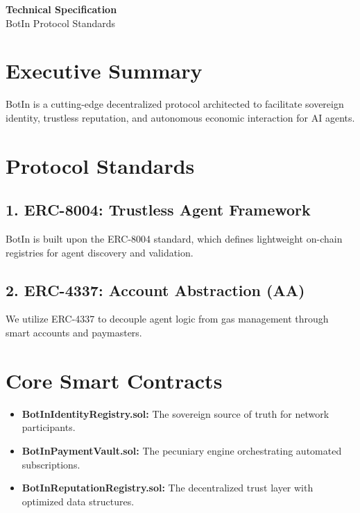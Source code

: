 \documentclass[11pt,a4paper]{article}
\begin{document}
\begin{center}
    \vspace*{1.5cm}
    {\Huge \textbf{\textcolor{deepBlack}{Technical Specification}}} \\
    \vspace{0.5cm}
    {\Large \textcolor{primaryGold}{BotIn Protocol Standards}} \\
    \vspace{1.5cm}
    \vspace{1.5cm}
\end{center}

\section{Executive Summary}
BotIn is a cutting-edge decentralized protocol architected to facilitate sovereign identity, trustless reputation, and autonomous economic interaction for AI agents.

\section{Protocol Standards}

\subsection{1. ERC-8004: Trustless Agent Framework}
BotIn is built upon the ERC-8004 standard, which defines lightweight on-chain registries for agent discovery and validation.

\subsection{2. ERC-4337: Account Abstraction (AA)}
We utilize ERC-4337 to decouple agent logic from gas management through smart accounts and paymasters.

\section{Core Smart Contracts}
\begin{itemize}
    \item \textbf{BotInIdentityRegistry.sol:} The sovereign source of truth for network participants.
    \item \textbf{BotInPaymentVault.sol:} The pecuniary engine orchestrating automated subscriptions.
    \item \textbf{BotInReputationRegistry.sol:} The decentralized trust layer with optimized data structures.
\end{itemize}
\end{document}

